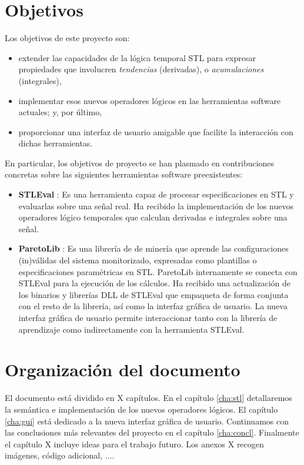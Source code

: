 \section{Objetivos}

Los objetivos de este proyecto son:

\begin{itemize}
\item extender las capacidades de la lógica temporal STL para expresar propiedades que involucren \textit{tendencias} (derivadas), o \textit{acumulaciones} (integrales),    
\item implementar esos nuevos operadores lógicos en las herramientas software actuales; y, por último,
\item proporcionar una interfaz de usuario amigable que facilite la interacción con dichas herramientas.  
\end{itemize}

En particular, los objetivos de proyecto se han plasmado en contribuciones concretas sobre las siguientes herramientas software preexistentes:
\begin{itemize}
\item \textbf{STLEval} \cite{StlEval}: Es una herramienta capaz de procesar especificaciones en STL y evaluarlas sobre una señal real. Ha recibido la implementación de los nuevos operadores lógico temporales que calculan derivadas e integrales sobre una señal.
\item \textbf{ParetoLib} \cite{ParetoLib}: Es una librería de de minería que aprende las configuraciones (in)válidas del sistema monitorizado, expresadas como plantillas o especificaciones paramétricas en STL. ParetoLib internamente se conecta con STLEval para la ejecución de los cálculos. Ha recibido una actualización de los binarios y librerías DLL de STLEval que empaqueta de forma conjunta con el resto de la librería, así como la interfaz gráfica de usuario. La nueva interfaz gráfica de usuario permite interaccionar tanto con la librería de aprendizaje como indirectamente con la herramienta STLEval.
\end{itemize}

\section{Organización del documento}

El documento está dividido en X capítulos. En el capítulo \ref{cha:stl} detallaremos la semántica e implementación de los nuevos operadores lógicos. El capítulo \ref{cha:gui} está dedicado a la nueva interfaz gráfica de usuario. Continuamos con las conclusiones más relevantes del proyecto en el capítulo \ref{cha:concl}. Finalmente el capítulo X incluye ideas para el trabajo futuro. Los anexos X recogen imágenes, código adicional, $\ldots$.

